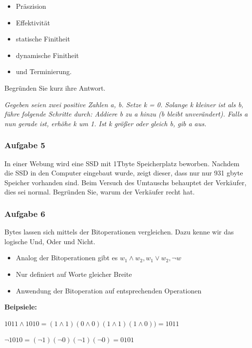 \documentclass[
  11pt,
  a4paper,
  DIV=11,
  numbers=noendperiod]{scrartcl}
\providecommand{\tightlist}{%
  \setlength{\itemsep}{0pt}\setlength{\parskip}{0pt}}\usepackage{longtable,booktabs,array}
\begin{document}
\begin{itemize}
\tightlist
\item
  Präszision
\item
  Effektivität
\item
  statische Finitheit
\item
  dynamische Finitheit
\item
  und Terminierung.
\end{itemize}

Begründen Sie kurz ihre Antwort.

\emph{Gegeben seien zwei positive Zahlen a, b. Setze k = 0. Solange k
kleiner ist als b, führe folgende Schritte durch: Addiere b zu a hinzu
(b bleibt unverändert). Falls a nun gerade ist, erhöhe k um 1. Ist k
größer oder gleich b, gib a aus.}

\subsubsection{Aufgabe 5}\label{aufgabe-5}

In einer Webung wird eine SSD mit 1Tbyte Speicherplatz beworben. Nachdem
die SSD in den Computer eingebaut wurde, zeigt dieser, dass nur nur 931
gbyte Speicher vorhanden sind. Beim Versuch des Umtauschs behauptet der
Verkäufer, dies sei normal. Begründen Sie, warum der Verkäufer recht
hat.

\subsubsection{Aufgabe 6}\label{aufgabe-6}

Bytes lassen sich mittels der Bitoperationen vergleichen. Dazu kenne wir
das logische Und, Oder und Nicht.

\begin{itemize}
\tightlist
\item
  Analog der Bitoperationen gibt es
  \(w_1 \land w_2, w_1 \lor w_2, \neg w\)
\item
  Nur definiert auf Worte gleicher Breite
\item
  Anwendung der Bitoperation auf entsprechenden Operationen
\end{itemize}

\textbf{Beipsiele:}

\(1011 \land 1010 = (1 \land 1)(0 \land 0)(1 \land 1)(1 \land 0)) = 1011\)

\(\neg 1010 = (\neg 1)(\neg 0)(\neg 1)(\neg 0) = 0101\)
\end{document}
